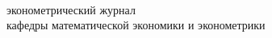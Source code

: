 \documentclass[12pt]{article}
\begin{document}

\pagestyle{empty}

\ \vfill

\centering 
{}

\vspace{15mm}


\vspace{15mm}


\vfill

эконометрический журнал \\ кафедры математической экономики и эконометрики%
\end{document}
